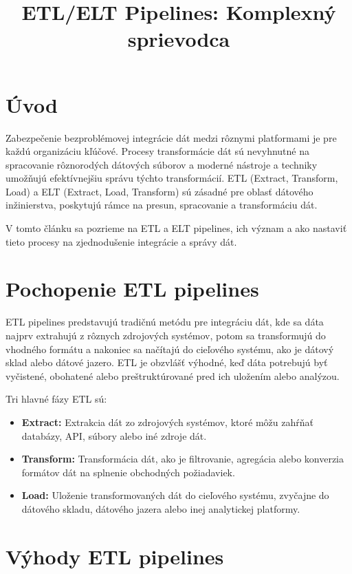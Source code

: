 \documentclass{article}
\title{ETL/ELT Pipelines: Komplexný sprievodca}
\author{}
\date{}
\begin{document}
\maketitle

\section{Úvod}

Zabezpečenie bezproblémovej integrácie dát medzi rôznymi platformami je pre každú organizáciu kľúčové. Procesy transformácie dát sú nevyhnutné na spracovanie rôznorodých dátových súborov a moderné nástroje a techniky umožňujú efektívnejšiu správu týchto transformácií. ETL (Extract, Transform, Load) a ELT (Extract, Load, Transform) sú zásadné pre oblasť dátového inžinierstva, poskytujú rámce na presun, spracovanie a transformáciu dát.

V tomto článku sa pozrieme na ETL a ELT pipelines, ich význam a ako nastaviť tieto procesy na zjednodušenie integrácie a správy dát.

\section{Pochopenie ETL pipelines}

ETL pipelines predstavujú tradičnú metódu pre integráciu dát, kde sa dáta najprv extrahujú z rôznych zdrojových systémov, potom sa transformujú do vhodného formátu a nakoniec sa načítajú do cieľového systému, ako je dátový sklad alebo dátové jazero. ETL je obzvlášť výhodné, keď dáta potrebujú byť vyčistené, obohatené alebo preštruktúrované pred ich uložením alebo analýzou.

Tri hlavné fázy ETL sú:

\begin{itemize}
    \item \textbf{Extract:} Extrakcia dát zo zdrojových systémov, ktoré môžu zahŕňať databázy, API, súbory alebo iné zdroje dát.
    \item \textbf{Transform:} Transformácia dát, ako je filtrovanie, agregácia alebo konverzia formátov dát na splnenie obchodných požiadaviek.
    \item \textbf{Load:} Uloženie transformovaných dát do cieľového systému, zvyčajne do dátového skladu, dátového jazera alebo inej analytickej platformy.
\end{itemize}

\section{Výhody ETL pipelines}
\end{document}
